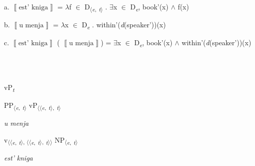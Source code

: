 \documentclass[output=paper,colorlinks,citecolor=brown]{./langscibook}
\begin{document}
\ea%
    \label{ex:tsedryk:11}
    \gll\\
        \\
    \glt
    \z

          a.   $\left\llbracket \text{est’ kniga}\right\rrbracket $ = ${\lambda}$f ${\in}$ D\textsubscript{${\langle}$}\textit{\textsubscript{e}}\textsubscript{,} \textit{\textsubscript{t}}\textsubscript{${\rangle}$} . ${\exists}$x ${\in}$ D\textit{\textsubscript{e}}, book'(x) ${\wedge}$ f(x)  

  b.   $\left\llbracket \text{u menja}\right\rrbracket $ = ${\lambda}$x ${\in}$ D\textit{\textsubscript{e}} . within'(\textit{d}(speaker'))(x)

  c.   $\left\llbracket \text{est’ kniga}\right\rrbracket $ ( $\left\llbracket \text{u menja}\right\rrbracket $) = ${\exists}$x ${\in}$ D\textit{\textsubscript{e}}, book'(x) ${\wedge}$                   within'(\textit{d}(speaker'))(x) 

\ea%
    \label{ex:tsedryk:12}
    \gll\\
        \\
    \glt
    \z

          vP\textit{\textsubscript{t}}

  PP\textsubscript{${\langle}$}\textit{\textsubscript{e}}\textsubscript{,} \textit{\textsubscript{t}}\textsubscript{${\rangle}$}  vP\textsubscript{${\langle}{\langle}$}\textit{\textsubscript{e}}\textsubscript{,} \textit{\textsubscript{t}}\textsubscript{${\rangle}$,} \textit{\textsubscript{t}}\textsubscript{${\rangle}$}

  \textit{u} \textit{menja} 

    v\textsubscript{${\langle}{\langle}$}\textit{\textsubscript{e}}\textsubscript{,} \textit{\textsubscript{t}}\textsubscript{${\rangle}$, ${\langle}{\langle}$}\textit{\textsubscript{e}}\textsubscript{,} \textit{\textsubscript{t}}\textsubscript{${\rangle}$,} \textit{\textsubscript{t}}\textsubscript{${\rangle}{\rangle}$}  NP\textsubscript{${\langle}$}\textit{\textsubscript{e}}\textsubscript{,} \textit{\textsubscript{t}}\textsubscript{${\rangle}$} 

         \textit{est’}  \textit{kniga}
\end{document}
